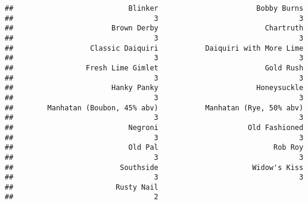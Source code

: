 \documentclass[
]{article}
\newenvironment{Shaded}{\begin{snugshade}}{\end{snugshade}}
\newcommand{\DataTypeTok}[1]{\textcolor[rgb]{0.13,0.29,0.53}{#1}}
\newcommand{\KeywordTok}[1]{\textcolor[rgb]{0.13,0.29,0.53}{\textbf{#1}}}
\newcommand{\NormalTok}[1]{#1}
\newcommand{\OperatorTok}[1]{\textcolor[rgb]{0.81,0.36,0.00}{\textbf{#1}}}
\newcommand{\StringTok}[1]{\textcolor[rgb]{0.31,0.60,0.02}{#1}}
\begin{document}
\begin{verbatim}
##                           Blinker                       Bobby Burns 
##                                 3                                 3 
##                       Brown Derby                         Chartruth 
##                                 3                                 3 
##                  Classic Daiquiri           Daiquiri with More Lime 
##                                 3                                 3 
##                 Fresh Lime Gimlet                         Gold Rush 
##                                 3                                 3 
##                       Hanky Panky                       Honeysuckle 
##                                 3                                 3 
##        Manhatan (Boubon, 45% abv)           Manhatan (Rye, 50% abv) 
##                                 3                                 3 
##                           Negroni                     Old Fashioned 
##                                 3                                 3 
##                           Old Pal                           Rob Roy 
##                                 3                                 3 
##                         Southside                      Widow's Kiss 
##                                 3                                 3 
##                        Rusty Nail 
##                                 2
\end{verbatim}

\begin{Shaded}
\end{Shaded}
\end{document}
